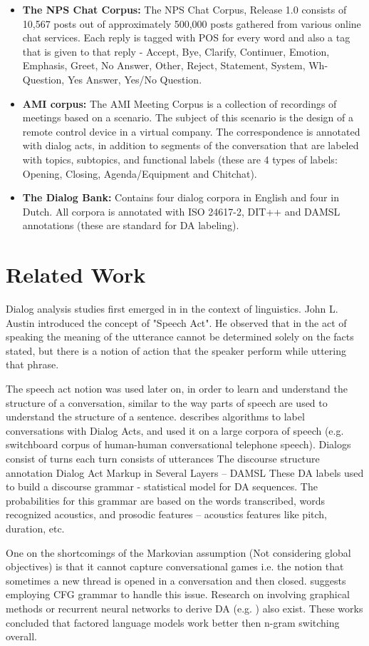 \begin{itemize}
	\item {\bf The NPS Chat Corpus:} The NPS Chat Corpus, Release 1.0 consists of 10,567 posts 
	out of approximately 500,000 posts gathered from various online chat services.
	Each reply is tagged with POS for every word and also a tag that is given to that reply - Accept, Bye, Clarify, Continuer, Emotion, Emphasis, Greet, No Answer, Other, Reject, Statement, System, Wh-Question, Yes Answer, Yes/No Question.
	\item {\bf AMI corpus:} The AMI Meeting Corpus is a collection of recordings of meetings based on a scenario. 
	The subject of this scenario is the design of a remote control device in a virtual company.
	The correspondence is annotated with dialog acts, in addition to segments of the conversation that are labeled with topics, 
	subtopics, and functional labels (these are 4 types of labels: Opening, Closing, Agenda/Equipment and Chitchat).
	\item {\bf The Dialog Bank:} Contains four dialog corpora in English and four in Dutch. 
	All corpora is annotated with ISO 24617-2, DIT++ and DAMSL annotations (these are standard for DA labeling).
\end{itemize}

\section{Related Work}
Dialog analysis studies first emerged in in the context of linguistics.
John L. Austin introduced the concept of "Speech Act". He observed that in the act of speaking 
the meaning of the utterance cannot be determined solely on the facts stated, 
but there is a notion of action that the speaker perform while uttering that phrase.

The speech act notion was used later on, in order to learn and understand the structure of a conversation, similar to the way parts of speech are used to understand the structure of a sentence. \cite{cs-CL-0006023} describes algorithms to label conversations with Dialog Acts, and used it on a large corpora of speech (e.g. switchboard corpus of human-human conversational telephone speech). 
Dialogs consist of turns each turn consists of utterances
The discourse structure annotation Dialog Act Markup in Several Layers – DAMSL
These DA labels used to build a discourse grammar - statistical model for DA sequences.
The probabilities for this grammar are based on the words transcribed, words recognized acoustics, 
and prosodic features – acoustics features like pitch, duration, etc.

One on the shortcomings of the Markovian assumption (Not considering global objectives) is that it cannot capture conversational games i.e. the notion that sometimes a new thread is opened in a conversation and then closed. 
\cite{Geertzen} suggests employing CFG grammar to handle this issue.
Research on involving graphical methods or recurrent neural networks to derive DA (e.g. \cite{DBLP:conf/icassp/2005,DBLP:conf/coling/1996}) also exist. These works concluded that factored language models work better then n-gram switching overall.